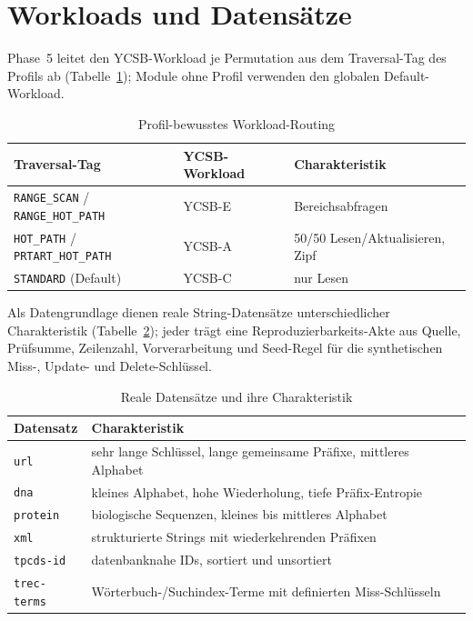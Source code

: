 \section{Workloads und Datensätze}\label{sec:workloads}

Phase~5 leitet den YCSB-Workload je Permutation aus dem Traversal-Tag des Profils ab
(Tabelle~\ref{tab:workload-routing}); Module ohne Profil verwenden den globalen Default-Workload.

\begin{table}[h]
  \centering
  \caption{Profil-bewusstes Workload-Routing}\label{tab:workload-routing}
  \begin{tabular}{lll}
    \toprule
    \textbf{Traversal-Tag} & \textbf{YCSB-Workload} & \textbf{Charakteristik} \\
    \midrule
    \texttt{RANGE\_SCAN} / \texttt{RANGE\_HOT\_PATH} & YCSB-E & Bereichsabfragen \\
    \texttt{HOT\_PATH} / \texttt{PRTART\_HOT\_PATH} & YCSB-A & 50/50 Lesen/Aktualisieren, Zipf \\
    \texttt{STANDARD} (Default) & YCSB-C & nur Lesen \\
    \bottomrule
  \end{tabular}
\end{table}

Als Datengrundlage dienen reale String-Datensätze unterschiedlicher Charakteristik
(Tabelle~\ref{tab:datasets}); jeder trägt eine Reproduzierbarkeits-Akte aus Quelle, Prüfsumme,
Zeilenzahl, Vorverarbeitung und Seed-Regel für die synthetischen Miss-, Update- und
Delete-Schlüssel.

\begin{table}[h]
  \centering
  \caption{Reale Datensätze und ihre Charakteristik}\label{tab:datasets}
  \begin{tabular}{ll}
    \toprule
    \textbf{Datensatz} & \textbf{Charakteristik} \\
    \midrule
    \texttt{url} & sehr lange Schlüssel, lange gemeinsame Präfixe, mittleres Alphabet \\
    \texttt{dna} & kleines Alphabet, hohe Wiederholung, tiefe Präfix-Entropie \\
    \texttt{protein} & biologische Sequenzen, kleines bis mittleres Alphabet \\
    \texttt{xml} & strukturierte Strings mit wiederkehrenden Präfixen \\
    \texttt{tpcds-id} & datenbanknahe IDs, sortiert und unsortiert \\
    \texttt{trec-terms} & Wörterbuch-/Suchindex-Terme mit definierten Miss-Schlüsseln \\
    \bottomrule
  \end{tabular}
\end{table}

